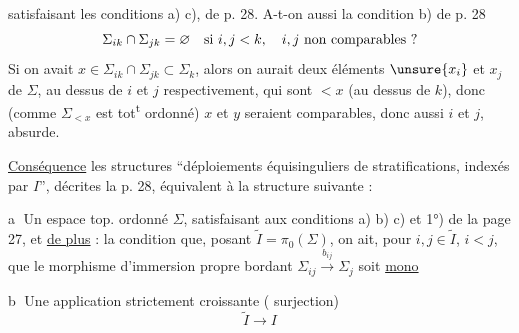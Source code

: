 satisfaisant les conditions a) c),  de p. 28.
A-t-on aussi la condition b) de p. 28
\[
\Sigma_{ik}\cap\Sigma_{jk}=\varnothing\quad\hbox{si }i,j<k,\quad
i,j\ \hbox{non comparables ?}
\]
Si on avait $x\in\Sigma_{ik}\cap\Sigma_{jk}\subset\Sigma_k$,
alors on aurait deux éléments $\unsure{x_i}$ et $x_j$ de $\Sigma$,
au dessus de $i$ et $j$ respectivement, qui sont $<x$
(au dessus de $k$), donc (comme $\Sigma_{<x}$ est tot\textsuperscript{t} ordonné)
 $x$ et $y$ seraient comparables, donc aussi
$i$ et $j$, absurde.

\uline{Conséquence} les structures ``déploiements
équisinguliers de stratifications, indexés par $I$'',
décrites  la p. 28, équivalent à la structure suivante :


\textcircled{a} Un \deleted{$\Sigma$} espace top. ordonné $\Sigma$,
satisfaisant aux conditions a) b) c) et 1°) de la page 27,
et \uline{de plus} : la condition que, 
posant $\widetilde I=\pi_0(\Sigma)$, on ait, pour
$i,j\in\widetilde I$, $i<j$, que le morphisme d'immersion
propre bordant $\Sigma_{ij}\xrightarrow{b_{ij}}\Sigma_j$ soit
\uline{mono}

\textcircled{b} Une application strictement croissante
( surjection)
\[
\widetilde I\longrightarrow I
\]
